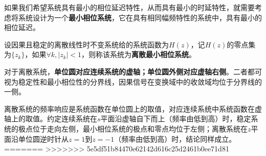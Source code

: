 如果我们希望系统具有最小的相位延迟特性，从而具有最小的时延特性，就需要考虑将系统设计为一个\textbf{最小相位系统}，它在具有相同幅频特性的系统中，具有最小的相位延迟。
\begin{definition}[离散最小相位系统]
    设因果且稳定的离散线性时不变系统给的系统函数为$H(z)$，记$H(z)$的零点集为$\{z_k\}$，如果$\forall k,|z_k|<1$，则称该系统为\textbf{离散最小相位系统}。
\end{definition} 

对于离散系统，\textbf{单位圆对应连续系统的虚轴；单位圆外侧对应虚轴右侧}。二者都可视为稳定性和最小相位性的分界线，因果信号在变换域中的收敛域均位于分界线的一侧。

离散系统的频率响应是系统函数在单位圆上的取值，对应连续系统中系统函数在虚轴上的取值。约定连续系统在$s$平面沿虚轴自下而上（频率由低到高）时，稳定系统的极点位于走向左侧，最小相位系统的极点和零点均位于左侧；离散系统在$z$平面沿单位圆逆时针从$z=1$到$z=-1$（频率由低到高）时，结论同样成立。
=======
>>>>>>> 5e5df51b84470e62142d616c25d2461b0ee71d81
